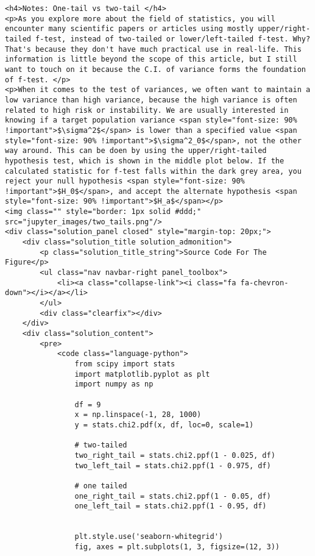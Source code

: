 \documentclass[11pt]{article}
\begin{document}
\begin{verbatim}
<h4>Notes: One-tail vs two-tail </h4>
<p>As you explore more about the field of statistics, you will encounter many scientific papers or articles using mostly upper/right-tailed f-test, instead of two-tailed or lower/left-tailed f-test. Why? That's because they don't have much practical use in real-life. This information is little beyond the scope of this article, but I still want to touch on it because the C.I. of variance forms the foundation of f-test. </p>
<p>When it comes to the test of variances, we often want to maintain a low variance than high variance, because the high variance is often related to high risk or instability. We are usually interested in knowing if a target population variance <span style="font-size: 90% !important">$\sigma^2$</span> is lower than a specified value <span style="font-size: 90% !important">$\sigma^2_0$</span>, not the other way around. This can be doen by using the upper/right-tailed hypothesis test, which is shown in the middle plot below. If the calculated statistic for f-test falls within the dark grey area, you reject your null hypothesis <span style="font-size: 90% !important">$H_0$</span>, and accept the alternate hypothesis <span style="font-size: 90% !important">$H_a$</span></p>
<img class="" style="border: 1px solid #ddd;" src="jupyter_images/two_tails.png"/>
<div class="solution_panel closed" style="margin-top: 20px;">
    <div class="solution_title solution_admonition">
        <p class="solution_title_string">Source Code For The Figure</p>
        <ul class="nav navbar-right panel_toolbox">
            <li><a class="collapse-link"><i class="fa fa-chevron-down"></i></a></li>
        </ul>
        <div class="clearfix"></div>
    </div>
    <div class="solution_content">
        <pre>
            <code class="language-python">
                from scipy import stats
                import matplotlib.pyplot as plt
                import numpy as np

                df = 9
                x = np.linspace(-1, 28, 1000)
                y = stats.chi2.pdf(x, df, loc=0, scale=1)

                # two-tailed
                two_right_tail = stats.chi2.ppf(1 - 0.025, df) 
                two_left_tail = stats.chi2.ppf(1 - 0.975, df)

                # one tailed
                one_right_tail = stats.chi2.ppf(1 - 0.05, df)
                one_left_tail = stats.chi2.ppf(1 - 0.95, df)


                plt.style.use('seaborn-whitegrid')
                fig, axes = plt.subplots(1, 3, figsize=(12, 3))


\end{verbatim}
\end{document}
